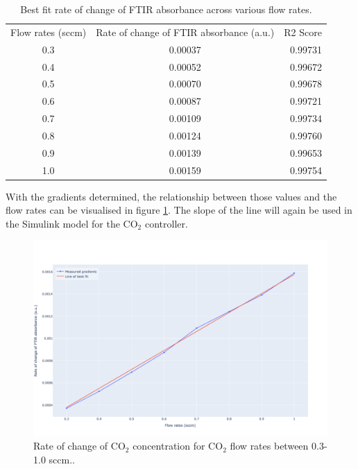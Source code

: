 \begin{table}[h!]
\centering
\caption{Best fit rate of change of FTIR absorbance across various flow rates.}
\label{tb:rate_of_change_absorbance_across_flow_rates_best_fit}
\begin{tabular}{ccr}
Flow rates (sccm) & Rate of change of FTIR absorbance (a.u.) & R2 Score \\
0.3               & 0.00037                                  & 0.99731  \\
0.4               & 0.00052                                  & 0.99672  \\
0.5               & 0.00070                                  & 0.99678  \\
0.6               & 0.00087                                  & 0.99721  \\
0.7               & 0.00109                                  & 0.99734  \\
0.8               & 0.00124                                  & 0.99760  \\
0.9               & 0.00139                                  & 0.99653  \\
1.0               & 0.00159                                  & 0.99754 
\end{tabular}
\end{table}

With the gradients determined, the relationship between those values and the flow rates can be visualised in figure \ref{fig:rate_of_change_of_absorbance_across_flow_rates}. The slope of the line will again be used in the Simulink model for the CO$_2$ controller.

\begin{figure}[h!]
	\centering
	\includegraphics[width=\linewidth]{chapter_5/figures/rate_of_change_of_absorbance_across_flow_rates.png}
	\caption{Rate of change of CO$_2$ concentration for CO$_2$ flow rates between 0.3-1.0 sccm..}
	\label{fig:rate_of_change_of_absorbance_across_flow_rates}
\end{figure}

